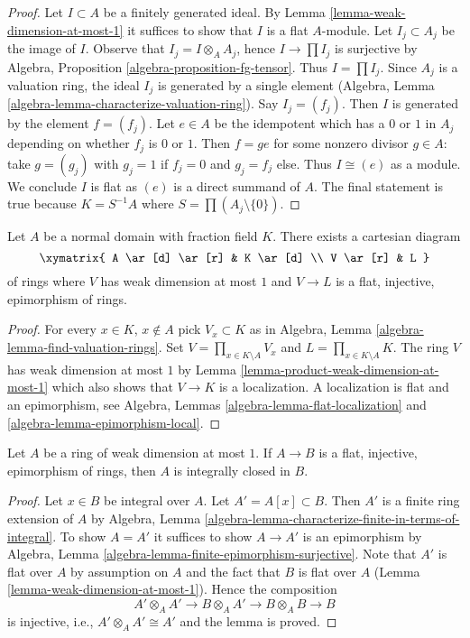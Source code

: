 \begin{proof}
Let $I \subset A$ be a finitely generated ideal.
By Lemma \ref{lemma-weak-dimension-at-most-1}
it suffices to show that $I$ is a flat $A$-module.
Let $I_j \subset A_j$ be the image of $I$.
Observe that $I_j = I \otimes_A A_j$, hence
$I \to \prod I_j$ is surjective by
Algebra, Proposition \ref{algebra-proposition-fg-tensor}.
Thus $I = \prod I_j$.
Since $A_j$ is a valuation ring, the ideal $I_j$
is generated by a single element
(Algebra, Lemma \ref{algebra-lemma-characterize-valuation-ring}).
Say $I_j = (f_j)$. Then $I$ is generated by the element $f = (f_j)$.
Let $e \in A$ be the idempotent which has a $0$ or $1$
in $A_j$ depending on whether $f_j$ is $0$ or $1$.
Then $f = g e$ for some nonzero divisor $g \in A$:
take $g = (g_j)$ with $g_j = 1$ if $f_j = 0$ and $g_j = f_j$ else.
Thus $I \cong (e)$ as a module. We conclude $I$ is flat as $(e)$ is a
direct summand of $A$. The final statement is true because
$K = S^{-1}A$ where $S = \prod (A_j \setminus \{0\})$.
\end{proof}

\begin{lemma}
\label{lemma-product-found-valuation-rings}
Let $A$ be a normal domain with fraction field $K$.
There exists a cartesian diagram
$$
\xymatrix{
A \ar[d] \ar[r] & K \ar[d] \\
V \ar[r] & L
}
$$
of rings where $V$ has weak dimension at most $1$
and $V \to L$ is a flat, injective, epimorphism of rings.
\end{lemma}

\begin{proof}
For every $x \in K$, $x \not \in A$ pick $V_x \subset K$ as in
Algebra, Lemma \ref{algebra-lemma-find-valuation-rings}.
Set $V = \prod_{x \in K \setminus A} V_x$ and
$L = \prod_{x \in K \setminus A} K$. The ring $V$
has weak dimension at most $1$ by
Lemma \ref{lemma-product-weak-dimension-at-most-1}
which also shows that $V \to K$ is a localization.
A localization is flat and an epimorphism, see
Algebra, Lemmas \ref{algebra-lemma-flat-localization} and
\ref{algebra-lemma-epimorphism-local}.
\end{proof}

\begin{lemma}
\label{lemma-weak-dimension-at-most-1-integrally-closed}
Let $A$ be a ring of weak dimension at most $1$.
If $A \to B$ is a flat, injective, epimorphism of rings, then
$A$ is integrally closed in $B$.
\end{lemma}

\begin{proof}
Let $x \in B$ be integral over $A$. Let $A' = A[x] \subset B$.
Then $A'$ is a finite ring extension of $A$ by
Algebra, Lemma \ref{algebra-lemma-characterize-finite-in-terms-of-integral}.
To show $A = A'$ it suffices to show $A \to A'$ is an epimorphism by
Algebra, Lemma \ref{algebra-lemma-finite-epimorphism-surjective}.
Note that $A'$ is flat over $A$ by assumption on $A$ and the fact that
$B$ is flat over $A$ (Lemma \ref{lemma-weak-dimension-at-most-1}).
Hence the composition
$$
A' \otimes_A A' \to B \otimes_A A' \to B \otimes_A B \to B
$$
is injective, i.e., $A' \otimes_A A' \cong A'$ and the lemma is proved.
\end{proof}

